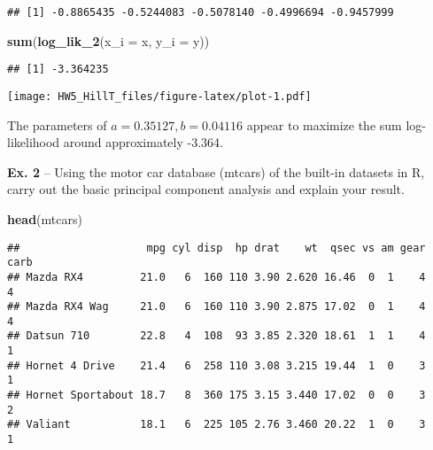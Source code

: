 \documentclass[
]{article}
\newenvironment{Shaded}{\begin{snugshade}}{\end{snugshade}}
\newcommand{\DataTypeTok}[1]{\textcolor[rgb]{0.13,0.29,0.53}{#1}}
\newcommand{\DecValTok}[1]{\textcolor[rgb]{0.00,0.00,0.81}{#1}}
\newcommand{\KeywordTok}[1]{\textcolor[rgb]{0.13,0.29,0.53}{\textbf{#1}}}
\newcommand{\NormalTok}[1]{#1}
\newcommand{\OperatorTok}[1]{\textcolor[rgb]{0.81,0.36,0.00}{\textbf{#1}}}
\begin{document}
\begin{verbatim}
## [1] -0.8865435 -0.5244083 -0.5078140 -0.4996694 -0.9457999
\end{verbatim}

\begin{Shaded}
\begin{Highlighting}[]
\KeywordTok{sum}\NormalTok{(}\KeywordTok{log\_lik\_2}\NormalTok{(}\DataTypeTok{x\_i =}\NormalTok{ x, }\DataTypeTok{y\_i =}\NormalTok{ y))}
\end{Highlighting}
\end{Shaded}

\begin{verbatim}
## [1] -3.364235
\end{verbatim}

\begin{Shaded}
\end{Shaded}

\texttt{[image: HW5\_HillT\_files/figure-latex/plot-1.pdf]}

The parameters of \(a = 0.35127, b = 0.04116\) appear to maximize the
sum log-likelihood around approximately -3.364.

\textbf{Ex. 2} -- Using the motor car database (mtcars) of the built-in
datasets in R, carry out the basic principal component analysis and
explain your result.

\begin{Shaded}
\begin{Highlighting}[]
\KeywordTok{head}\NormalTok{(mtcars)}
\end{Highlighting}
\end{Shaded}

\begin{verbatim}
##                    mpg cyl disp  hp drat    wt  qsec vs am gear carb
## Mazda RX4         21.0   6  160 110 3.90 2.620 16.46  0  1    4    4
## Mazda RX4 Wag     21.0   6  160 110 3.90 2.875 17.02  0  1    4    4
## Datsun 710        22.8   4  108  93 3.85 2.320 18.61  1  1    4    1
## Hornet 4 Drive    21.4   6  258 110 3.08 3.215 19.44  1  0    3    1
## Hornet Sportabout 18.7   8  360 175 3.15 3.440 17.02  0  0    3    2
## Valiant           18.1   6  225 105 2.76 3.460 20.22  1  0    3    1
\end{verbatim}
\end{document}
